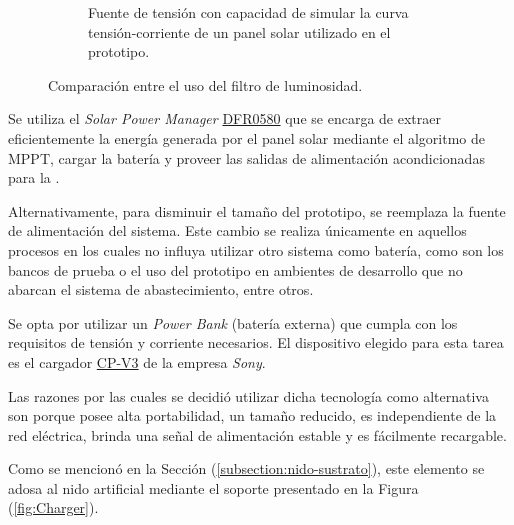 \begin{figure}[H]
\begin{subfigure}{0.3\textwidth}
        	\caption{Fuente de tensión con capacidad de simular la curva tensión-corriente de un panel solar utilizado en el prototipo.}
			\label{fig:fuente_prototipo}
        \end{subfigure}
	\caption{Comparación entre el uso del filtro de luminosidad.}
	\label{fig:elementos_prototipo}
\end{figure}

Se utiliza el \textit{Solar Power Manager} \href{https://wiki.dfrobot.com/Solar_Power_Manager_For_12V_Lead-Acid_Battery_SKU__DFR0580}{DFR0580} que se encarga de extraer eficientemente la energía generada por el panel solar mediante el algoritmo de MPPT, cargar la batería y proveer las salidas de alimentación acondicionadas para la \rpi.

Alternativamente, para disminuir el tamaño del prototipo, se reemplaza la fuente de alimentación del sistema. Este cambio se realiza únicamente en aquellos procesos en los cuales no influya utilizar otro sistema como batería, como son los bancos de prueba o el uso del prototipo en ambientes de desarrollo que no abarcan el sistema de abastecimiento, entre otros.

Se opta por utilizar un \textit{Power Bank} (batería externa) que cumpla con los requisitos de tensión y corriente necesarios. El dispositivo elegido para esta tarea es el cargador \href{https://www.sony.com/electronics/support/res/manuals/W000/W0002536M.pdf}{CP-V3} de la empresa \textit{Sony}.

Las razones por las cuales se decidió utilizar dicha tecnología como alternativa son porque posee alta portabilidad, un tamaño reducido, es independiente de la red eléctrica, brinda una señal de alimentación estable y es fácilmente recargable. 

Como se mencionó en la Sección (\ref{subsection:nido-sustrato}), este elemento se adosa al nido artificial mediante el soporte presentado en la Figura (\ref{fig:Charger}). 

